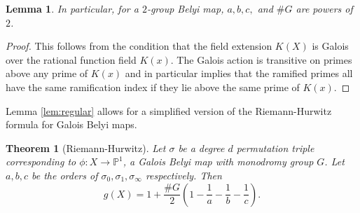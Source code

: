 \documentclass{dcthesis}
\newcommand{\PP}{\mathbb P}
\numberwithin{equation}{section}
\newtheorem{theorem}[equation]{Theorem}
\newtheorem{lemma}[equation]{Lemma}
\theoremstyle{definition}
\theoremstyle{remark}
\begin{document}
{{{\begin{lemma}
      In particular,
      for a $2$-group Belyi map,
      $a,b,c,$ and $\#G$ are powers of $2$.
    \end{lemma}
    \begin{proof}
      This follows from the condition that
      the field extension $K(X)$ is Galois
      over the rational function field $K(x)$.
      The Galois action is transitive on
      primes above any prime of $K(x)$
      and in particular implies that the
      ramified primes all have the same ramification
      index if they lie above the same prime
      of $K(x)$.
    \end{proof}
    Lemma \ref{lem:regular}
    allows for a simplified version of the
    Riemann-Hurwitz formula for Galois Belyi maps.
    \begin{theorem}
      [Riemann-Hurwitz]
      \label{thm:riemannhurwitzgalois}
      Let $\sigma$ be a degree $d$
      permutation triple corresponding to
      $\phi\colon X\to\PP^1$, a
      Galois Belyi map with monodromy group $G$.
      Let $a,b,c$ be the orders of
      $\sigma_0,\sigma_1,\sigma_\infty$
      respectively.
      Then
      \begin{equation}
        \label{eqn:riemannhurwitzgalois}
        g(X) = 1+\frac{\#G}{2}
        \left(1-\frac{1}{a}-\frac{1}{b}-
        \frac{1}{c}\right).
      \end{equation}
    \end{theorem}
  }
}}
\end{document}
